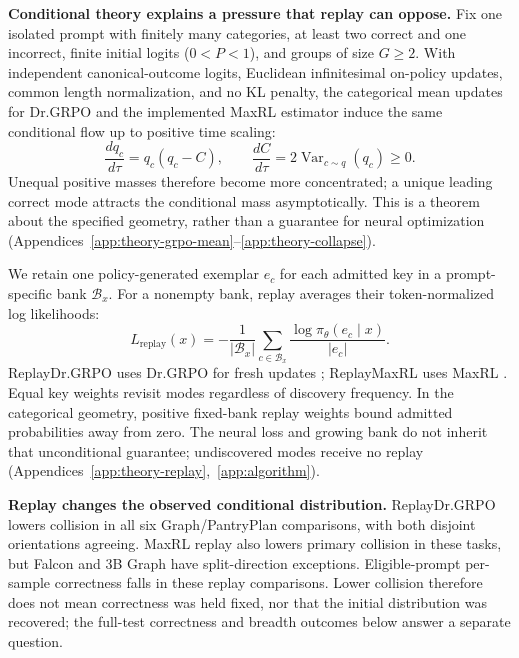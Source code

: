 \textbf{Conditional theory explains a pressure that replay can oppose.}
Fix one isolated prompt with finitely many categories, at least two correct
and one incorrect, finite initial logits ($0<P<1$), and groups of size $G\ge2$.
With independent canonical-outcome logits, Euclidean infinitesimal on-policy
updates, common length normalization, and no KL penalty, the categorical
mean updates for Dr.GRPO and the implemented MaxRL estimator induce the
same conditional flow up to positive time scaling:
\begin{equation}
 \frac{dq_c}{d\tau}=q_c(q_c-C),\qquad
 \frac{dC}{d\tau}=2\operatorname{Var}_{c\sim q}(q_c)\ge0.
 \label{eq:workshop-collision-flow}
\end{equation}
Unequal positive masses therefore become more concentrated; a unique leading
correct mode attracts the conditional mass asymptotically. This is a theorem
about the specified geometry, rather than a guarantee for neural optimization
(Appendices~\ref{app:theory-grpo-mean}--\ref{app:theory-collapse}).

We retain one policy-generated exemplar $e_c$ for each admitted key in a
prompt-specific bank $\mathcal B_x$. For a nonempty bank, replay averages
their token-normalized log likelihoods:
\begin{equation}
 L_{\mathrm{replay}}(x)=-\frac{1}{|\mathcal B_x|}
 \sum_{c\in\mathcal B_x}\frac{\log\pi_\theta(e_c\mid x)}{|e_c|}.
 \label{eq:lm-verified-replay}
\end{equation}
ReplayDr.GRPO uses Dr.GRPO for fresh updates \citep{liu2025understanding};
ReplayMaxRL uses MaxRL \citep{tajwar2026maxrl}. Equal key weights revisit modes
regardless of discovery frequency. In the categorical geometry, positive
fixed-bank replay weights bound admitted probabilities away from zero.
The neural loss and growing bank do not inherit that unconditional guarantee;
undiscovered modes receive no replay
(Appendices~\ref{app:theory-replay},~\ref{app:algorithm}).

\textbf{Replay changes the observed conditional distribution.}
ReplayDr.GRPO lowers collision in all six Graph/PantryPlan comparisons, with
both disjoint orientations agreeing. MaxRL replay also lowers primary
collision in these tasks, but Falcon and 3B Graph have split-direction
exceptions. Eligible-prompt per-sample correctness falls in these replay
comparisons. Lower collision therefore does not mean correctness was held
fixed, nor that the initial distribution was recovered; the full-test
correctness and breadth outcomes below answer a separate question.

